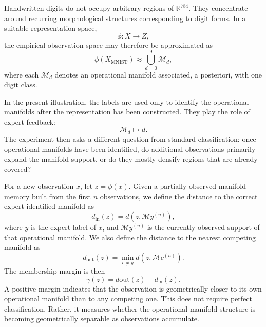 \documentclass[11pt,a4paper]{article}
\begin{document}
Handwritten digits do not occupy arbitrary regions of $\mathbb{R}^{784}$. They concentrate around recurring morphological structures corresponding to digit forms. In a suitable representation space,
\begin{equation}
\phi: X \longrightarrow Z,
\end{equation}
the empirical observation space may therefore be approximated as
\begin{equation}
\phi(X_{\mathrm{MNIST}}) \approx \bigcup_{d=0}^{9} \mathcal{M}_d,
\end{equation}
where each $\mathcal{M}_d$ denotes an operational manifold associated, a posteriori, with one digit class.

In the present illustration, the labels are used only to identify the operational manifolds after the representation has been constructed. They play the role of expert feedback:
\begin{equation}
\mathcal{M}_d \mapsto d.
\end{equation}
The experiment then asks a different question from standard classification: once operational manifolds have been identified, do additional observations primarily expand the manifold support, or do they mostly densify regions that are already covered?

For a new observation $x$, let $z=\phi(x)$. Given a partially observed manifold memory built from the first $n$ observations, we define the distance to the correct expert-identified manifold as
\begin{equation}
d_{\mathrm{in}}(z)
=
d\left(z,\mathcal{M}{y}^{(n)}\right),
\end{equation}
where $y$ is the expert label of $x$, and $\mathcal{M}{y}^{(n)}$ is the currently observed support of that operational manifold. We also define the distance to the nearest competing manifold as
\begin{equation}
d_{\mathrm{out}}(z)
=
\min_{c \neq y}
d\left(z,\mathcal{M}{c}^{(n)}\right).
\end{equation}
The membership margin is then
\begin{equation}
\gamma(z)
=
d{\mathrm{out}}(z)-d_{\mathrm{in}}(z).
\end{equation}
A positive margin indicates that the observation is geometrically closer to its own operational manifold than to any competing one. This does not require perfect classification. Rather, it measures whether the operational manifold structure is becoming geometrically separable as observations accumulate.
\end{document}
